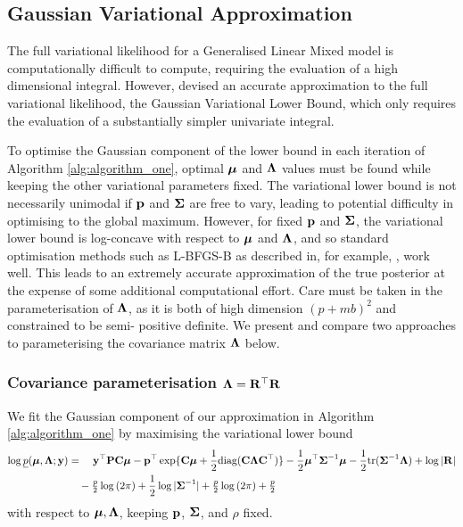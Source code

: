 	\subsection{Gaussian Variational Approximation}
			
	The full variational likelihood for a Generalised Linear Mixed model is computationally difficult to
	compute, requiring the evaluation of a high dimensional integral. However, \citep{Ormerod2012} devised
	an accurate approximation to the full variational likelihood, the Gaussian Variational Lower Bound,
	which only requires the evaluation of a substantially simpler univariate integral.
		
	To optimise the Gaussian component of the lower bound in each iteration of Algorithm
	\ref{alg:algorithm_one}, optimal ${\boldsymbol \mu}$ and ${\boldsymbol \Lambda}$ values must be found while keeping the other
	variational parameters fixed. The variational lower bound is not necessarily unimodal if ${\bf p}$ and
	${\boldsymbol \Sigma}$ are free to vary, leading to potential difficulty in optimising to the global maximum.
	However, for fixed ${\bf p}$ and ${\boldsymbol \Sigma}$, the variational lower bound is log-concave with respect to
	${\boldsymbol \mu}$ and ${\boldsymbol \Lambda}$, and so standard optimisation methods such as L-BFGS-B as described in, for
	example, \citep{Liu1989} \citep{Nocedal2006}, work well. This leads to an extremely accurate
	approximation of the true posterior at the expense of some additional computational effort. Care must be
	taken in the parameterisation of ${\boldsymbol \Lambda}$, as it is both of high dimension $(p + mb)^2$ and
	constrained to be semi- positive definite. We present and compare two approaches to parameterising the
	covariance matrix ${\boldsymbol \Lambda}$ below.
		
	\subsubsection{Covariance parameterisation ${\boldsymbol \Lambda} = {\bf R}^\top {\bf R}$}
	
	We fit the Gaussian component of our approximation in Algorithm \ref{alg:algorithm_one} by maximising 
	the variational lower bound	
	\begin{align*}
		\log \underline{p}({\boldsymbol \mu}, {\boldsymbol \Lambda}; {\bf y}) & = \quad {\bf y}^\top{\bf P} {\bf C} {\boldsymbol\mu} - {\bf p}^\top \exp\{{\bf C} {\boldsymbol \mu} + \frac{1}{2} \text{diag}({\bf C} {\boldsymbol \Lambda} {\bf C}^\top)\} - \frac{1}{2} {\boldsymbol \mu}^\top {\boldsymbol\Sigma}^{-1} {\boldsymbol \mu} - \frac{1}{2} \text{tr}{({\boldsymbol\Sigma}^{-1} {\boldsymbol\Lambda})} + \log{|{\bf R}|} \\
		                                        & \quad - \tfrac{p}{2} \log{(2 \pi)} + \frac{1}{2} \log{|{\boldsymbol\Sigma}^{-1}|} + \tfrac{p}{2} \log{(2 \pi)} + \tfrac{p}{2}                                                                              
	\end{align*}
	\noindent with respect to ${\boldsymbol \mu}, {\boldsymbol \Lambda}$, keeping ${\bf p}$, ${\boldsymbol \Sigma}$, and $\rho$ fixed.
			
